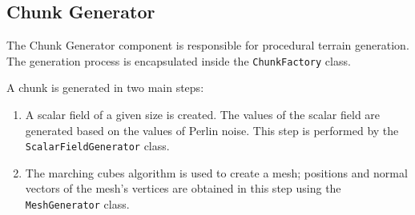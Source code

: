 \subsection{Chunk Generator}
The Chunk Generator component is responsible for procedural terrain generation.
The generation process is encapsulated inside the \texttt{ChunkFactory} class.

A chunk is generated in two main steps:
\begin{enumerate}
    \item A scalar field of a given size is created.
          The values of the scalar field are generated based on the values of Perlin noise.
          This step is performed by the \texttt{ScalarFieldGenerator} class.
    \item The marching cubes algorithm is used to create a mesh;
          positions and normal vectors of the mesh's vertices are obtained in this step using the \texttt{MeshGenerator} class.
\end{enumerate}